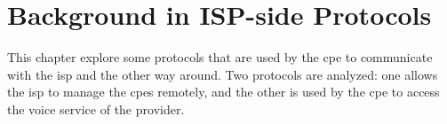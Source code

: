 \section{Background in ISP-side Protocols}
\label{section:bgd_isp_proto}

This chapter explore some protocols that are used by the \gls{cpe} to communicate with the \gls{isp} and the other way around. Two protocols are analyzed: one allows the \gls{isp} to manage the \glspl{cpe} remotely, and the other is used by the \gls{cpe} to access the voice service of the provider.




